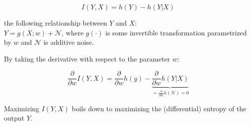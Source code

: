 \begin{frame}


\begin{equation}
I(Y,X) = h(Y) - h(Y|X)
\end{equation}

 the following relationship between $Y$ and $X$:\\
$Y = g(X;w) + \mathcal{N}$, where $g(\cdot)$ is some invertible transformation parametrized by $w$ and $\mathcal{N}$ is additive noise.

By taking the derivative with respect to the parameter $w$:

\begin{equation}
\frac{\partial}{\partial w} I(Y,X) = \frac{\partial}{\partial w}h(y) - 
\underbrace{\frac{\partial}{\partial w} h(Y|X)}_{= \frac{\partial}{\partial w} h(\mathcal{N}) = 0}
\end{equation}

Maximizing $I(Y,X)$ boils down to maximizing the (differential) entropy of the output $Y$. 



\end{frame}
